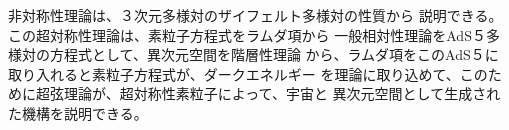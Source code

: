\documentclass{jsarticle}
\begin{document}
\title{}
\author{}
\date{}
\maketitle

  非対称性理論は、３次元多様対のザイフェルト多様対の性質から
説明できる。この超対称性理論は、素粒子方程式をラムダ項から
一般相対性理論をAdS５多様対の方程式として、異次元空間を階層性理論
から、ラムダ項をこのAdS５に取り入れると素粒子方程式が、ダークエネルギー
を理論に取り込めて、このために超弦理論が、超対称性素粒子によって、宇宙と
異次元空間として生成された機構を説明できる。
\end{document}
